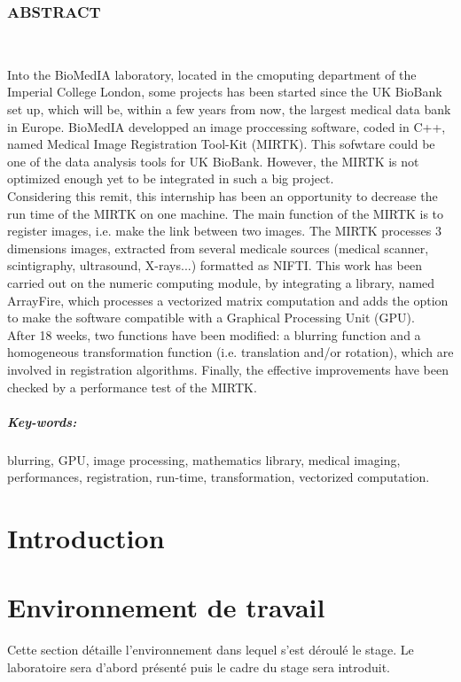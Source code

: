 \documentclass[10pt]{report}
\begin{document}
\subsection*{ABSTRACT}
~\par
Into the BioMedIA laboratory, located in the cmoputing department of the Imperial College London, some projects has been started since the UK BioBank set up, which will be, within a few years from now, the largest medical data bank in Europe. BioMedIA developped an image proccessing software, coded in C++, named Medical Image Registration Tool-Kit (MIRTK). This sofwtare could be one of the data analysis tools for UK BioBank. However, the MIRTK is not optimized enough yet to be integrated in such a big project.\\
Considering this remit, this internship has been an opportunity to decrease the run time of the MIRTK on one machine. The main function of the MIRTK is to register images, i.e. make the link between two images. The MIRTK processes 3 dimensions images, extracted from several medicale sources (medical scanner, scintigraphy, ultrasound, X-rays...) formatted as NIFTI. This work has been carried out on the numeric computing module, by integrating a library, named ArrayFire, which processes a vectorized matrix computation and adds the option to make the software compatible with a Graphical Processing Unit (GPU).\\
After 18 weeks, two functions have been modified: a blurring function and a homogeneous transformation function (i.e. translation and/or rotation), which are involved in registration algorithms. Finally, the effective improvements have been checked by a performance test of the MIRTK. 	

\paragraph*{Key-words:} blurring, GPU, image processing, mathematics library, medical imaging, performances, registration, run-time, transformation, vectorized computation.

\renewcommand\contentsname{Sommaire}
\tableofcontents

\newpage

\chapter*{Introduction}

\chapter{Environnement de travail} 
	Cette section détaille l'environnement dans lequel s'est déroulé le stage. Le laboratoire sera d'abord présenté puis le cadre du stage sera introduit.
\end{document}
